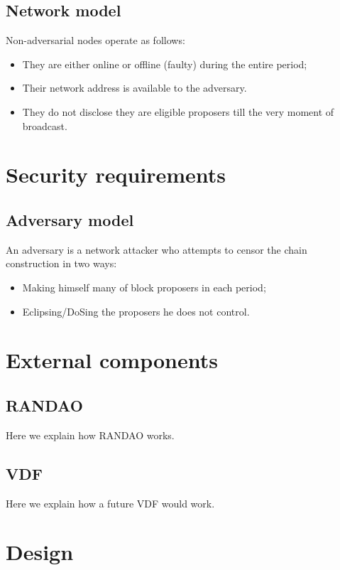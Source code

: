 \documentclass{article}
\begin{document}
\subsection{Network model}

Non-adversarial nodes operate as follows:
\begin{itemize}
    \item They are either online or offline (faulty) during the entire period;
    \item Their network address is available to the adversary.
    \item They do not disclose they are eligible proposers till the very moment of broadcast.
\end{itemize}

\section{Security requirements}

\subsection{Adversary model}

An adversary is a network attacker who attempts to censor the chain construction in two ways:
\begin{itemize}
    \item Making himself many of block proposers in each period;
    \item Eclipsing/DoSing the proposers he does not control.
\end{itemize}

\section{External components}


\subsection{RANDAO}

Here we explain how RANDAO works.

\subsection{VDF}

Here we explain how a future VDF would work.

\section{Design}
\end{document}
